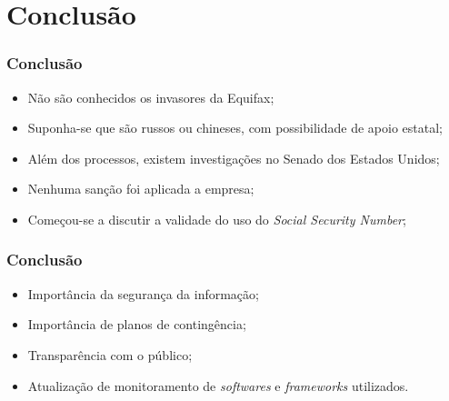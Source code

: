 \documentclass{beamer}
\begin{document}
	\section{Conclusão}
	\begin{frame}
		\frametitle{Conclusão}
		\begin{itemize}
			\item Não são conhecidos os invasores da Equifax;
			\item Suponha-se que são russos ou chineses, com possibilidade de apoio estatal;
			\item Além dos processos, existem investigações no Senado dos Estados Unidos;
			\item Nenhuma sanção foi aplicada a empresa;
			\item Começou-se a discutir a validade do uso do \textit{Social Security Number};
		\end{itemize}
	\end{frame}
	\begin{frame}
		\frametitle{Conclusão}
		\begin{itemize}
			\item Importância da segurança da informação;
			\item Importância de planos de contingência;
			\item Transparência com o público;
			\item Atualização de monitoramento de \textit{softwares} e \textit{frameworks} utilizados.
		\end{itemize}
	\end{frame}
	\begin{frame}
		\titlepage
	\end{frame}
\end{document}
